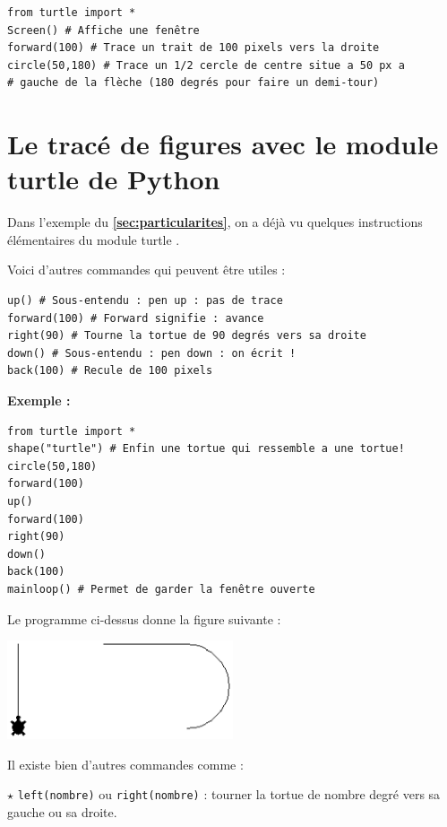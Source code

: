 \begin{lstlisting}
from turtle import *
Screen() # Affiche une fenêtre
forward(100) # Trace un trait de 100 pixels vers la droite
circle(50,180) # Trace un 1/2 cercle de centre situe a 50 px a 
# gauche de la flèche (180 degrés pour faire un demi-tour)
\end{lstlisting}


\section{Le tracé de figures avec le module turtle de Python}


Dans l'exemple du \textbf{\ref{sec:particularites}}, on a déjà vu quelques instructions élémentaires du module \og turtle \fg{}.

Voici d'autres commandes qui peuvent être utiles :

\begin{lstlisting}
up() # Sous-entendu : pen up : pas de trace
forward(100) # Forward signifie : avance
right(90) # Tourne la tortue de 90 degrés vers sa droite
down() # Sous-entendu : pen down : on écrit !
back(100) # Recule de 100 pixels
\end{lstlisting}

\textbf{\large Exemple :}

\begin{lstlisting}
from turtle import *
shape("turtle") # Enfin une tortue qui ressemble a une tortue!
circle(50,180)
forward(100)
up()
forward(100)
right(90)
down()
back(100)
mainloop() # Permet de garder la fenêtre ouverte
\end{lstlisting}

Le programme ci-dessus donne la figure suivante :

\begin{center}
\includegraphics[width=0.5\textwidth]{turtle1}
\end{center}

Il existe bien d'autres commandes comme :

$\star$ \verb!left(nombre)! ou \verb!right(nombre)! : tourner la tortue de nombre degré vers sa gauche ou sa droite.

